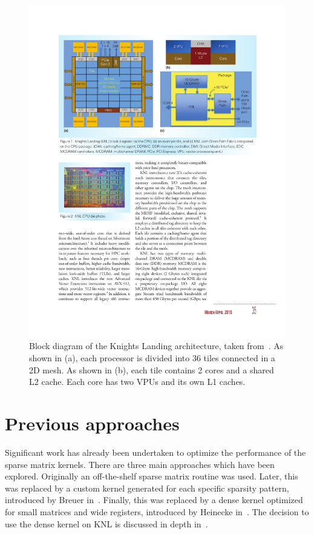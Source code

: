\begin{figure}[tb]
\centering
\includegraphics[width=\textwidth]{images/knl_arch.pdf}
\caption{Block diagram of the Knights Landing architecture, taken from~\cite{Sodani:2016:KLS:2927511.2927563}. As shown in (a), each processor is divided into 36 tiles connected in a 2D mesh. As shown in (b), each tile contains 2 cores and a shared L2 cache. Each core has two VPUs and its own L1 caches.}
\end{figure}


\section{Previous approaches}

    Significant work has already been undertaken to optimize the performance of the sparse matrix kernels. There are three main approaches which have been explored. Originally an off-the-shelf sparse matrix routine was used. Later, this was replaced by a custom kernel generated for each specific sparsity pattern, introduced by Breuer in~\cite{breuer}. Finally, this was replaced by a dense kernel optimized for small matrices and wide registers, introduced by Heinecke in~\cite{Heinecke:2016:LAS:3014904.3015017}. The decision to use the dense kernel on KNL is discussed in depth in~\cite{Jeffers:2016:IXP:3050856}. 
    
